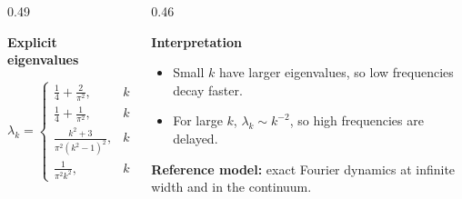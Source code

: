 \documentclass[aspectratio=169,9pt]{beamer}
\newcommand{\tightlist}{\setlength\itemsep{1.3pt}\setlength\parskip{0pt}\setlength\parsep{0pt}}
\begin{document}
\begin{frame}
	\vspace{1mm}
	\begin{columns}[T,onlytextwidth]
		\pause
		\begin{column}{0.49\textwidth}
			\begin{whitecard}[height=34mm]
				{\scriptsize\bfseries Explicit eigenvalues}\par\vspace{0.5mm}
				{\tiny
					\[
						\lambda_k =
						\begin{cases}
							\displaystyle \frac14+\frac{2}{\pi^2},
							 & k=0,                 \\[0.4mm]
							\displaystyle \frac14+\frac{1}{\pi^2},
							 & k=1,                 \\[0.4mm]
							\displaystyle \frac{k^2+3}{\pi^2(k^2-1)^2},
							 & k\ge 2 \text{ even}, \\[0.4mm]
							\displaystyle \frac{1}{\pi^2 k^2},
							 & k\ge 3 \text{ odd}.
						\end{cases}
					\]
				}
			\end{whitecard}
		\end{column}

		\pause
		\begin{column}{0.46\textwidth}
			\begin{bluecard}[height=20mm]
				{\scriptsize\bfseries Interpretation}\par\vspace{1mm}
				\begin{itemize}\tightlist\tiny
					\item Small $k$ have larger eigenvalues, so low frequencies decay faster.
					\item For large $k$, $\lambda_k\sim k^{-2}$, so high frequencies are delayed.
				\end{itemize}
			\end{bluecard}

			\vspace{2mm}

			\pause
			\begin{whitecard}[height=11mm]
				\centering
				{\tiny\bfseries Reference model:}
				{\tiny exact Fourier dynamics at infinite width and in the continuum.}
			\end{whitecard}
		\end{column}
	\end{columns}

\end{frame}
\end{document}
